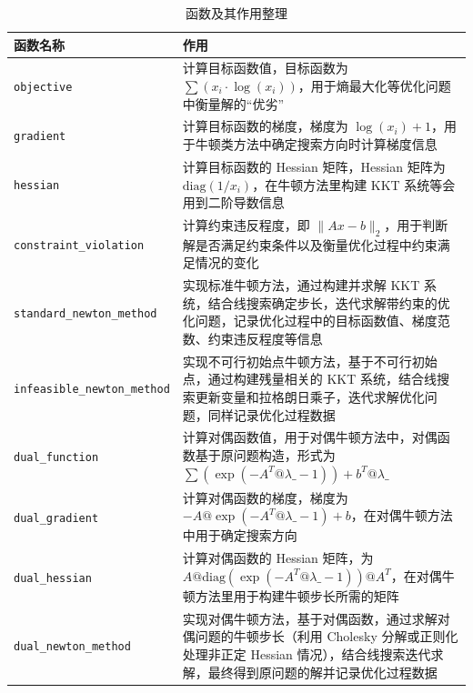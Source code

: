 \documentclass{article}
\newenvironment{solution_cn}{%
  \begin{proof}[解答]%
  \kaishu  %
}{%
  \end{proof}%
}
\begin{document}
\begin{solution_cn}
\begin{table}[H]
    \centering
    \caption{函数及其作用整理}
    \begin{tabular}{l>{\raggedright\arraybackslash}p{}} 
    \toprule
    \textbf{函数名称} & \textbf{作用} \\
    \midrule
    \texttt{objective} & 计算目标函数值，目标函数为 \(\sum(x_i \cdot \log(x_i))\)，用于熵最大化等优化问题中衡量解的“优劣”  \\
    \texttt{gradient} & 计算目标函数的梯度，梯度为 \(\log(x_i) + 1\)，用于牛顿类方法中确定搜索方向时计算梯度信息 \\
    \texttt{hessian} & 计算目标函数的 Hessian 矩阵，Hessian 矩阵为 \(\text{diag}(1/x_i)\)，在牛顿方法里构建 KKT 系统等会用到二阶导数信息 \\
    \texttt{constraint\_violation} & 计算约束违反程度，即 \(\|Ax - b\|_2\)，用于判断解是否满足约束条件以及衡量优化过程中约束满足情况的变化 \\
    \texttt{standard\_newton\_method} & 实现标准牛顿方法，通过构建并求解 KKT 系统，结合线搜索确定步长，迭代求解带约束的优化问题，记录优化过程中的目标函数值、梯度范数、约束违反程度等信息 \\
    \texttt{infeasible\_newton\_method} & 实现不可行初始点牛顿方法，基于不可行初始点，通过构建残量相关的 KKT 系统，结合线搜索更新变量和拉格朗日乘子，迭代求解优化问题，同样记录优化过程数据 \\
    \texttt{dual\_function} & 计算对偶函数值，用于对偶牛顿方法中，对偶函数基于原问题构造，形式为 \(\sum(\exp(-A^T @ \lambda\_ - 1)) + b^T @ \lambda\_\)  \\
    \texttt{dual\_gradient} & 计算对偶函数的梯度，梯度为 \(-A @ \exp(-A^T @ \lambda\_ - 1) + b\)，在对偶牛顿方法中用于确定搜索方向 \\
    \texttt{dual\_hessian} & 计算对偶函数的 Hessian 矩阵，为 \(A @ \text{diag}(\exp(-A^T @ \lambda\_ - 1)) @ A^T\)，在对偶牛顿方法里用于构建牛顿步长所需的矩阵 \\
    \texttt{dual\_newton\_method} & 实现对偶牛顿方法，基于对偶函数，通过求解对偶问题的牛顿步长（利用 Cholesky 分解或正则化处理非正定 Hessian 情况），结合线搜索迭代求解，最终得到原问题的解并记录优化过程数据 \\
    \bottomrule
    \end{tabular}
    \label{tab:function_description}
\end{table}
\begin{table}[H]
    \centering
    \caption{数据文件保存说明}

\end{table}
\end{solution_cn}
\end{document}
